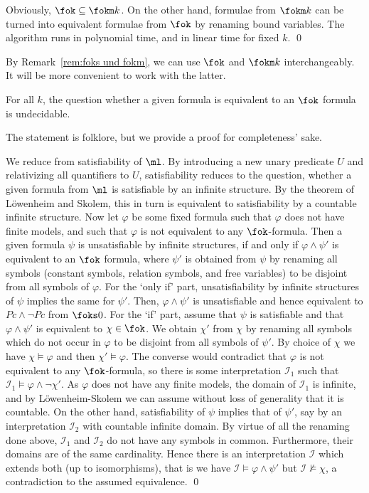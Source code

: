 \documentclass{LMCS}
\renewcommand{\phi}{\varphi}
\begin{document}
\begin{rem}\label{rem:foks und fokm}
Obviously, $\fok\subseteq\fokm k$. 
On the other hand, formulae from $\fokm k$ can be turned 
into equivalent formulae from $\fok$ by renaming bound variables. 
The algorithm runs in polynomial time, and in linear time for fixed $k$. 
\qed\end{rem}

By Remark~\ref{rem:foks und fokm}, 
we can use $\fok$ and $\fokm k$ interchangeably. 
It will be more convenient to work with the latter. 

\begin{rem}
For all $k$, 
the question whether a given formula is equivalent to an $\fok$ formula 
is undecidable. 
\end{rem}

The statement is folklore, but we provide a proof for completeness' sake. 

\proof
We reduce from satisfiability of $\ml$. 
By introducing a new unary predicate $U$ 
and relativizing all quantifiers to $U$, 
satisfiability reduces to the question, 
whether a given formula from $\ml$ is satisfiable by an infinite structure. 
By the theorem of L\"owenheim and Skolem, this in turn is equivalent 
to satisfiability by a countable infinite structure. 
Now let $\phi$ be some fixed formula 
such that $\phi$ does not have finite models, 
and such that $\phi$ is not equivalent to any $\fok$-formula. 
Then a given formula $\psi$ is unsatisfiable by infinite structures, 
if and only if $\phi\wedge\psi'$ is equivalent to an $\fok$ formula, 
where $\psi'$ is obtained from $\psi$ 
by renaming all symbols 
(constant symbols, relation symbols, and free variables) 
to be disjoint from all symbols of $\phi$. 
For the \lq{}only if\rq{} part, 
unsatisfiability by infinite structures of $\psi$ 
implies the same for $\psi'$. 
Then, $\phi\wedge\psi'$ is unsatisfiable and hence equivalent 
to $Pc\wedge\neg Pc$ from $\foks0$. 
For the \lq{}if\rq{} part, 
assume that $\psi$ is satisfiable 
and that $\phi\wedge\psi'$ is equivalent to $\chi\in\fok$. 
We obtain $\chi'$ from $\chi$ 
by renaming all symbols which do not occur in $\phi$ 
to be disjoint from all symbols of $\psi'$. 
By choice of $\chi$ we have $\chi\models\phi$ and then $\chi'\models\phi$. 
The converse would contradict 
that $\phi$ is not equivalent to any $\fok$-formula, 
so there is some interpretation $\mathcal I_1$ 
such that $\mathcal I_1\models\phi\wedge\neg\chi'$. 
As $\phi$ does not have any finite models, 
the domain of $\mathcal I_1$ is infinite, and by L\"owenheim-Skolem 
we can assume without loss of generality that it is countable. 
On the other hand, satisfiability of $\psi$ implies that of $\psi'$, 
say by an interpretation $\mathcal I_2$ with countable infinite domain. 
By virtue of all the renaming done above, 
$\mathcal I_1$ and $\mathcal I_2$ do not have any symbols in common. 
Furthermore, their domains are of the same cardinality. 
Hence there is an interpretation $\mathcal I$ which extends both 
(up to isomorphisms), 
that is we have $\mathcal I\models\phi\wedge\psi'$ 
but $\mathcal I\not\models\chi$, 
a contradiction to the assumed equivalence. 
\qed
\end{document}
